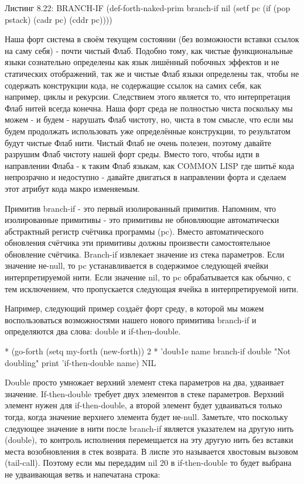{{{Листинг 8.22: BRANCH-IF
(def-forth-naked-prim branch-if nil
(setf pc (if (pop pstack)
(cadr pc)
(cddr pc))))

Наша форт система в своём текущем состоянии (без возможности вставки ссылок на саму себя) - почти чистый Флаб. Подобно тому, как чистые функциональные языки сознательно определены как язык лишённый побочных эффектов и не статических отображений, так же и чистые Флаб языки определены так, чтобы не содержать конструкции кода, не содержащие ссылок на самих себя, как например, циклы и рекурсии. Следствием этого является то, что интерпретация Флаб нитей всегда конечна. Наша форт среда не полностью чиста поскольку мы можем - и будем - нарушать Флаб чистоту, но, чиста в том смысле, что если мы будем продолжать использовать уже определённые конструкции, то результатом будут чистые Флаб нити. Чистый Флаб не очень полезен, поэтому давайте разрушим Флаб чистоту нашей форт среды. Вместо того, чтобы идти в направлении Флаба - к таким Флаб языкам, как COMMON LISP где шитьё кода непрозрачно и недоступно - давайте двигаться в направлении форта и сделаем этот атрибут кода макро изменяемым.

Примитив branch-if - это первый изолированный примитив. Напомним, что изолированные примитивы - это примитивы не обновляющие автоматически абстрактный регистр счётчика программы (pc). Вместо автоматического обновления счётчика эти примитивы должны произвести самостоятельное обновление счётчика. Branch-if извлекает значение из стека параметров. Если значение не-null, то pc устанавливается в содержимое следующей ячейки интерпретируемой нити. Если значение nil, то pc обрабатывается как обычно, с тем исключением, что пропускается следующая ячейка в интерпретируемой нити.

Например, следующий пример создаёт форт среду, в которой мы можем воспользоваться возможностями нашего нового примитива branch-if и определяются два слова: double и if-then-double.

* (go-forth (setq my-forth (new-forth))
{ 2 * } ’doub1e name
{ branch-if double "Not doubling" print }
’if-then-double name)
NIL

Double просто умножает верхний элемент стека параметров на два, удваивает значение. If-then-double требует двух элементов в стеке параметров. Верхний элемент нужен для if-then-double, а второй элемент будет удваиваться только тогда, когда значение верхнего элемента будет не-null. Заметьте, что поскольку следующее значение в нити после branch-if является указателем на другую нить (double), то контроль исполнения перемещается на эту другую нить без вставки места возобновления в стек возврата. В лиспе это называется хвостовым вызовом (tail-call). Поэтому если мы передадим nil 20 в if-then-double то будет выбрана не удваивающая ветвь и напечатана строка:

}}}
